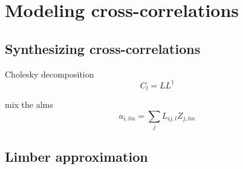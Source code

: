 \chapter{Modeling cross-correlations}


\section{Synthesizing cross-correlations}

Cholesky decomposition
\begin{equation}
  C_l = LL^\dag
\end{equation}

mix the alms
\begin{equation}
  a_{i,lm} =\sum_j L_{ij,l} Z_{j,lm}
\end{equation}


\section{Limber approximation}
